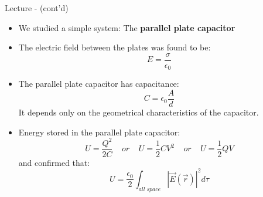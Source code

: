 \begin{frame}{Lecture \summarizedlecture - \lecturesummarytitle (cont'd)}

\begin{itemize}

   \item We studied a simple system: The {\bf parallel plate capacitor}

   \item The electric field between the plates was found to be:
      \begin{equation*}
        E = \frac{\sigma}{\epsilon_0}
      \end{equation*}

   \item The parallel plate capacitor has capacitance:
      \begin{equation*}
          C = \epsilon_0 \frac{A}{d}
      \end{equation*}
      It depends only on the geometrical characteristics of the capacitor.

   \item Energy stored in the parallel plate capacitor:
      \begin{equation*}
          U = \frac{Q^2}{2C} \;\;\;\; or \;\;\;\;
          U = \frac{1}{2} C V^2 \;\;\;\; or \;\;\;\;
          U = \frac{1}{2} Q V
      \end{equation*}
      and confirmed that:
      \begin{equation*}
          U = \frac{\epsilon_0}{2} \int_{all\;space} |\vec{E}(\vec{r})|^2  d\tau
      \end{equation*}

\end{itemize}

\end{frame}

%
%
%

